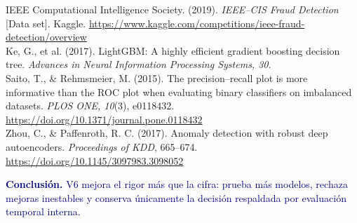 \documentclass[9pt]{article}
\newcommand{\takeaway}[1]{\par\noindent\textcolor{navy}{\textbf{Conclusión.} #1}\par}
\newcommand{\subhead}[1]{\vspace{2pt}{\color{blue}\bfseries #1}\par}
\begin{document}
\subhead{Referencias APA 7} \scriptsize
IEEE Computational Intelligence Society. (2019). \textit{IEEE--CIS Fraud Detection} [Data set]. Kaggle. \url{https://www.kaggle.com/competitions/ieee-fraud-detection/overview}\\
Ke, G., et al. (2017). LightGBM: A highly efficient gradient boosting decision tree. \textit{Advances in Neural Information Processing Systems, 30}.\\
Saito, T., \& Rehmsmeier, M. (2015). The precision--recall plot is more informative than the ROC plot when evaluating binary classifiers on imbalanced datasets. \textit{PLOS ONE, 10}(3), e0118432. \url{https://doi.org/10.1371/journal.pone.0118432}\\
Zhou, C., \& Paffenroth, R. C. (2017). Anomaly detection with robust deep autoencoders. \textit{Proceedings of KDD}, 665--674. \url{https://doi.org/10.1145/3097983.3098052}
\vfill\takeaway{V6 mejora el rigor más que la cifra: prueba más modelos, rechaza mejoras inestables y conserva únicamente la decisión respaldada por evaluación temporal interna.}
\end{document}
